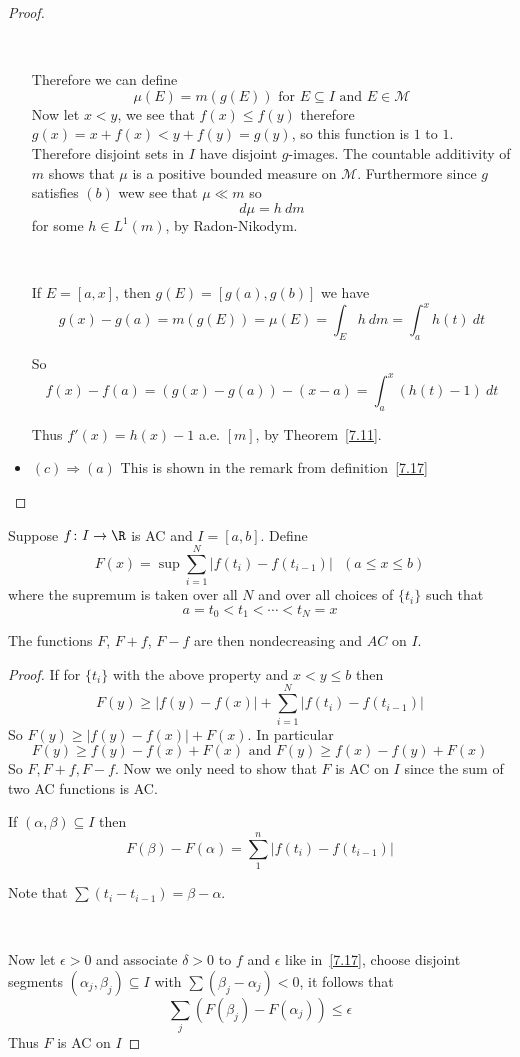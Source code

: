 \begin{theorem}
\begin{proof}
\begin{itemize}
            \

            Therefore we can define \[
                \mu(E) = m(g(E)) \text{ for }E\subseteq I\text{ and }E\in \mathcal{M}    
            \]
            Now let $x<y$, we see that $f(x)\leq f(y)$ therefore $g(x) = x+f(x)<y+f(y) = g(y)$, so this function is $1$ to $1$. Therefore disjoint sets in $I$ have disjoint $g$-images. The countable additivity of $m$ shows that $\mu$ is a positive bounded measure on $\mathcal{M}$. Furthermore since $g$ satisfies $(b)$ wew see that $\mu\ll m$ so\[
                d\mu = h~dm    
            \]
            for some $h\in L^1(m)$, by Radon-Nikodym.

            \

            If $E = [a,x]$, then $g(E) = [g(a),g(b)]$  we have\[
                g(x) - g(a) = m(g(E)) = \mu(E) = \int_E h~dm = \int_a^x h(t)~dt    
            \]

            So \[
                f(x) - f(a) = (g(x)-g(a)) - (x-a) = \int_a^x (h(t)-1)~dt     
            \]

            Thus $f'(x) = h(x)-1$ a.e. $[m]$, by Theorem~\ref{7.11}.
            \item $(c)\Rightarrow (a)$ This is shown in the remark from definition~\ref*{7.17}
        \end{itemize}
    \end{proof}
\end{theorem}

\begin{theorem}
Suppose $f\colon I\rightarrow \R$ is AC and $I = [a,b]$. Define\[
    F(x) = \sup \sum_{i=1}^N|f(t_i)-f(t_{i-1})| \text{ } (a\leq x\leq b)   
\]
where the supremum is taken over all $N$ and over all choices of $\{t_i\}$ such that \[
    a=t_0<t_1<\cdots<t_N=x    
\]

The functions $F$, $F+f$, $F-f$ are then nondecreasing and $AC$ on $I$.
\begin{proof}
    If for $\{t_i\}$ with the above property and $x<y\leq b$ then \[
        F(y)\geq |f(y)-f(x)|+\sum_{i=1}^N |f(t_i) - f(t_{i-1})|    
    \]
    So $F(y)\geq |f(y)-f(x)|+F(x)$. In particular \[
        F(y) \geq f(y)-f(x)+F(x)\text{ and }F(y)\geq f(x)-f(y)+F(x)    
    \]
    So $F,F+f,F-f$. Now we only need to show that $F$ is AC on $I$ since the sum of two AC functions is AC.

    If $(\alpha,\beta)\subseteq I$ then \[
        F(\beta)-F(\alpha) = \sum_{1}^n |f(t_i)-f(t_{i-1})|    
    \]

    Note that $\sum (t_i-t_{i-1}) = \beta - \alpha$.

    \

    Now let $\epsilon>0$ and associate $\delta>0$ to $f$ and $\epsilon$ like in~\ref{7.17}, choose disjoint segments $(\alpha_j,\beta_j)\subseteq I$ with $\sum(\beta_j-\alpha_j)<0$, it follows that\[
        \sum_j (F(\beta_j)-F(\alpha_j))\leq \epsilon    
    \]
    Thus $F$ is AC on $I$
\end{proof}
\end{theorem}

